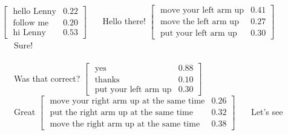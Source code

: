 \begin{Transcript}[p!]
\begin{dialogue} \vspace{3mm}
 $\begin{bmatrix}\text{ hello Lenny} & 0.22 \\
\text{ follow me} & 0.20 \\
\text{ hi Lenny} & 0.53 \end{bmatrix}$ \vspace{3mm}
 \ \ \ Hello there!\vspace{3mm}
 $\begin{bmatrix}\text{ move your left arm up} & 0.41 \\
\text{ move the left arm up} & 0.27 \\
\text{ put your left arm up} & 0.30 \end{bmatrix}$ \vspace{3mm}
 \ \ \ Sure! \vspace{2mm}\\
 \\
 \vspace{2mm}
 \ \ \ Was that correct? \vspace{3mm}
 $\begin{bmatrix}\text{ yes} & 0.88 \\
\text{ thanks} & 0.10 \\
\text{ put your left arm up} & 0.30 \end{bmatrix}$ \vspace{2mm} \\
 \vspace{3mm}
 \ \ \ Great \vspace{3mm}
 $\begin{bmatrix}\text{ move your right arm up at the same time} & 0.26 \\
\text{ put the right arm up at the same time} & 0.32 \\
\text{  move the right arm up at the same time} & 0.38 \end{bmatrix}$ \vspace{3mm}
 \ \ \ Let's see \vspace{1mm} \\
 \vspace{2mm}

\end{dialogue}
\end{Transcript}
